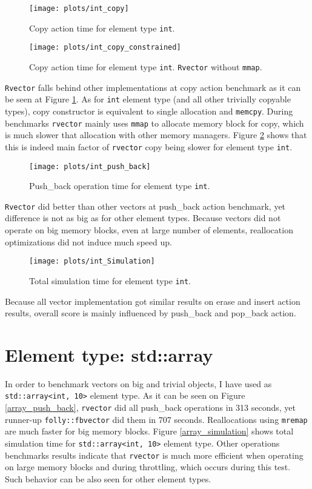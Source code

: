 \documentclass[inz, english, shortabstract]{iithesis}
\begin{document}
\begin{figure}[h!]
\texttt{[image: plots/int\_copy]}
\caption{Copy action time for element type \lstinline{int}.}
\label{int_copy}
\end{figure}

\begin{figure}[h!]
\texttt{[image: plots/int\_copy\_constrained]}
\caption{Copy action time for element type \lstinline{int}. {\tt Rvector} without {\tt mmap}.}
\label{int_copy_constrained}
\end{figure}

{\tt Rvector} falls behind other implementations at copy action benchmark as it can be seen at Figure \ref{int_copy}. As for \lstinline{int} element type (and all other trivially copyable types), copy constructor is equivalent to single allocation and {\tt memcpy}. During benchmarks {\tt rvector} mainly uses {\tt mmap} to allocate memory block for copy, which is much slower that allocation with other memory managers. Figure \ref{int_copy_constrained} shows that this is indeed main factor of {\tt rvector} copy being slower for element type \lstinline{int}.

\begin{figure}[h!]
\texttt{[image: plots/int\_push\_back]}
\caption{Push\_back operation time for element type \lstinline{int}.}
\label{int_push_back}
\end{figure}

{\tt Rvector} did better than other vectors at push\_back action benchmark, yet difference is not as big as for other element types. Because vectors did not operate on big memory blocks, even at large number of elements, reallocation optimizations did not induce much speed up.

\begin{figure}[h!]
\texttt{[image: plots/int\_Simulation]}
\caption{Total simulation time for element type \lstinline{int}.}
\label{int_simulation}
\end{figure}

Because all vector implementation got similar results on erase and insert action results, overall score is mainly influenced by push\_back and pop\_back action.
\clearpage
\section{Element type: std::array}
In order to benchmark vectors on big and trivial objects, I have used as \lstinline{std::array<int, 10>} element type. As it can be seen on Figure \ref{array_push_back}, {\tt rvector} did all push\_back operations in 313 seconds, yet runner-up {\tt folly::fbvector} did them in 707 seconds. Reallocations using {\tt mremap} are much faster for big memory blocks. Figure \ref{array_simulation} shows total simulation time for \lstinline{std::array<int, 10>} element type. Other operations benchmarks results indicate that {\tt rvector} is much more efficient when operating on large memory blocks and during {throttling}, which occurs during this test. Such behavior can be also seen for other element types.
\end{document}
